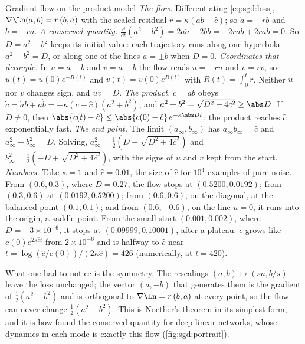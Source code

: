 \begin{refsection}
\begin{computation}{Gradient flow on the product model}\label{comp:sgd:flow}
\step \emph{The flow.} Differentiating \eqref{eq:sgd:loss}, $\nabla\Ln(a,b)=r\,(b,a)$ with the scaled residual $r=\kappa(ab-\hat c)$; so $\dot a=-rb$ and $\dot b=-ra$.
\step \emph{A conserved quantity.} $\frac{\dd}{\dd t}(a^2-b^2)=2a\dot a-2b\dot b=-2rab+2rab=0$. So $D=a^2-b^2$ keeps its initial value: each trajectory runs along one hyperbola $a^2-b^2=D$, or along one of the lines $a=\pm b$ when $D=0$.
\step \emph{Coordinates that decouple.} In $u=a+b$ and $v=a-b$ the flow reads $\dot u=-ru$ and $\dot v=rv$, so $u(t)=u(0)e^{-R(t)}$ and $v(t)=v(0)e^{R(t)}$ with $R(t)=\int_0^tr$. Neither $u$ nor $v$ changes sign, and $uv=D$.
\step \emph{The product.} $c=ab$ obeys $\dot c=\dot ab+a\dot b=-\kappa(c-\hat c)(a^2+b^2)$, and $a^2+b^2=\sqrt{D^2+4c^2}\ge\abs D$. If $D\ne0$, then $\abs{c(t)-\hat c}\le\abs{c(0)-\hat c}\,e^{-\kappa\abs Dt}$: the product reaches $\hat c$ exponentially fast.
\step \emph{The end point.} The limit $(a_\infty,b_\infty)$ has $a_\infty b_\infty=\hat c$ and $a_\infty^2-b_\infty^2=D$. Solving, $a_\infty^2=\frac12(D+\sqrt{D^2+4\hat c^2})$ and $b_\infty^2=\frac12(-D+\sqrt{D^2+4\hat c^2})$, with the signs of $u$ and $v$ kept from the start.
\step \emph{Numbers.} Take $\kappa=1$ and $\hat c=0.01$, the size of $\hat c$ for $10^4$ examples of pure noise. From $(0.6,0.3)$, where $D=0.27$, the flow stops at $(0.5200,0.0192)$; from $(0.3,0.6)$ at $(0.0192,0.5200)$; from $(0.6,0.6)$, on the diagonal, at the balanced point $(0.1,0.1)$; and from $(0.6,-0.6)$, on the line $u=0$, it runs into the origin, a saddle point. From the small start $(0.001,0.002)$, where $D=-3\times10^{-6}$, it stops at $(0.09999,0.10001)$, after a plateau: $c$ grows like $c(0)e^{2\kappa\hat ct}$ from $2\times10^{-6}$ and is halfway to $\hat c$ near $t=\log(\hat c/c(0))/(2\kappa\hat c)=426$ (numerically, at $t=420$).
\end{computation}

What one had to notice is the symmetry. The rescalings $(a,b)\mapsto(sa,b/s)$ leave the loss unchanged; the vector $(a,-b)$ that generates them is the gradient of $\frac12(a^2-b^2)$ and is orthogonal to $\nabla\Ln=r\,(b,a)$ at every point, so the flow can never change $\frac12(a^2-b^2)$. This is Noether's theorem in its simplest form, and it is how \textcite{SaxeEtAl2014} found the conserved quantity for deep linear networks, whose dynamics in each mode is exactly this flow (\cref{fig:sgd:portrait}).


\end{refsection}
